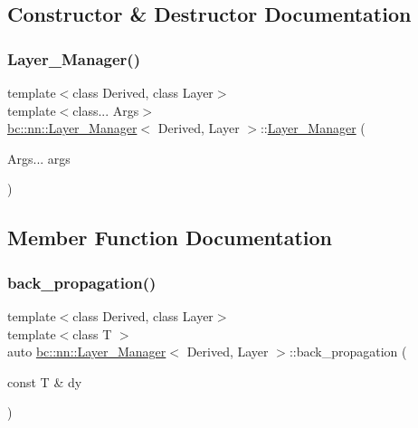 \subsection{Constructor \& Destructor Documentation}
\mbox{\label{structbc_1_1nn_1_1Layer__Manager_a6380a6af1c2939a1c8ddb85f7afdc56d}} 
\subsubsection{\texorpdfstring{Layer\+\_\+\+Manager()}{Layer\_Manager()}}
{\footnotesize\ttfamily template$<$class Derived, class Layer$>$ \\
template$<$class... Args$>$ \\
\hyperlink{structbc_1_1nn_1_1Layer__Manager}{bc\+::nn\+::\+Layer\+\_\+\+Manager}$<$ Derived, Layer $>$\+::\hyperlink{structbc_1_1nn_1_1Layer__Manager}{Layer\+\_\+\+Manager} (\begin{DoxyParamCaption}\item[{Args...}]{args }\end{DoxyParamCaption})\hspace{0.3cm}{\ttfamily [inline]}}



\subsection{Member Function Documentation}
\mbox{\label{structbc_1_1nn_1_1Layer__Manager_ae3ce714c4ab44c3b0422e4f496c41467}} 
\subsubsection{\texorpdfstring{back\+\_\+propagation()}{back\_propagation()}}
{\footnotesize\ttfamily template$<$class Derived, class Layer$>$ \\
template$<$class T $>$ \\
auto \hyperlink{structbc_1_1nn_1_1Layer__Manager}{bc\+::nn\+::\+Layer\+\_\+\+Manager}$<$ Derived, Layer $>$\+::back\+\_\+propagation (\begin{DoxyParamCaption}\item[{const T \&}]{dy }\end{DoxyParamCaption})\hspace{0.3cm}{\ttfamily [inline]}}

